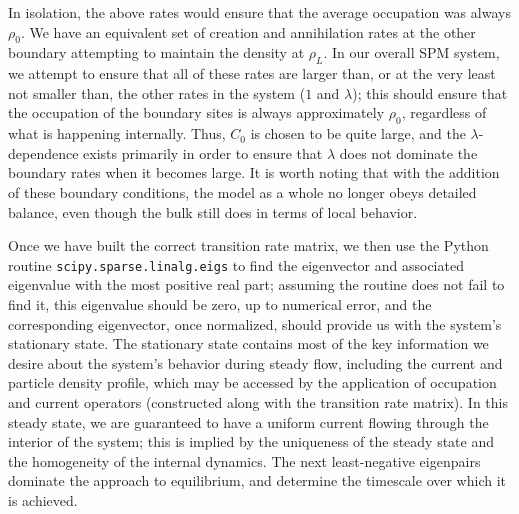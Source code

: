 \documentclass[
reprint, amsmath,amssymb,
]{revtex4-1}
\begin{document}
In isolation, the above rates would ensure that the average occupation was always $\rho_0$. We have an equivalent set of creation and annihilation rates at the other boundary attempting to maintain the density at $\rho_L$. In our overall SPM system, we attempt to ensure that all of these rates are larger than, or at the very least not smaller than,
the other rates in the system ($1$ and $\lambda$); this should ensure that the occupation of the boundary sites is always approximately $\rho_0$, regardless of what is happening internally.
Thus, $C_0$ is chosen to be quite large, and the $\lambda$-dependence exists primarily in order to ensure that $\lambda$ does not dominate the boundary rates when it becomes large.
It is worth noting that with the addition of these boundary conditions, the model as a whole no longer obeys detailed balance, even though the bulk still does in terms of
local behavior.

Once we have built the correct transition rate matrix, we then use the Python routine \texttt{scipy.sparse.linalg.eigs} to find the eigenvector and associated eigenvalue with the most positive real part; assuming the routine does not fail
to find it, this eigenvalue should be zero, up to numerical error, and the corresponding eigenvector, once normalized, should provide us with the system's stationary state.
The stationary state contains most of the key information we desire about the system's behavior during steady flow, including the current and particle density profile, which may be accessed
by the application of occupation and current operators (constructed along with the transition rate matrix). In this steady state, we are guaranteed to have a uniform current flowing through the interior of the system;
this is implied by the uniqueness of the steady state and the homogeneity of the internal dynamics.
The next least-negative eigenpairs dominate the approach to equilibrium, and determine the timescale over which it
is achieved.
\end{document}

